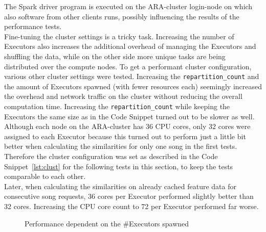 \noindent The Spark driver program is executed on the ARA-cluster login-node on which also software from other clients runs, possibly influencing the results of the performance tests.\\
Fine-tuning the cluster settings is a tricky task. Increasing the number of Executors also increases the additional overhead of managing the Executors and shuffling the data, while on the other side more unique tasks are being distributed over the compute nodes. To get a performant cluster configuration, various other cluster settings were tested. Increasing the \lstinline{repartition_count} and the amount of Executors spawned (with fewer resources each) seemingly increased the overhead and network traffic on the cluster without reducing the overall computation time. Increasing the \lstinline{repartition_count} while keeping the Executors the same size as in the Code Snippet turned out to be slower as well.\\ 
Although each node on the ARA-cluster has 36 CPU cores, only 32 cores were assigned to each Executor because this turned out to perform just a little bit better when calculating the similarities for only one song in the first tests. Therefore the cluster configuration was set as described in the Code Snippet~\ref{lst:clust} for the following tests in this section, to keep the tests comparable to each other.\\
Later, when calculating the similarities on already cached feature data for consecutive song requests, 36 cores per Executor performed slightly better than 32 cores. Increasing the CPU core count to 72 per Executor performed far worse.\\ 

\FloatBarrier
\begin{figure}[htbp]
   	\centering
   	\caption{Performance dependent on the \#Executors spawned}
   	\label{perfspark7}
\end{figure}
\FloatBarrier

